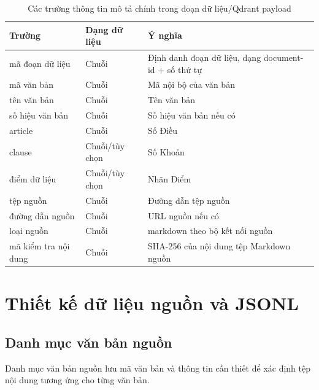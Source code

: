 \documentclass[12pt,a4paper,oneside]{report}
\begin{document}
\begin{longtable}{|L{3.4cm}|L{3.3cm}|L{7.8cm}|}
  \caption{Các trường thông tin mô tả chính trong đoạn dữ liệu/Qdrant payload}\label{tab:qdrant-payload} \\
  \hline
  \textbf{Trường}      & \textbf{Dạng dữ liệu} & \textbf{Ý nghĩa}                                        \\
  \hline
  mã đoạn dữ liệu      & Chuỗi                 & Định danh đoạn dữ liệu, dạng document-id + số thứ tự    \\
  \hline
  mã văn bản           & Chuỗi                 & Mã nội bộ của văn bản                                   \\
  \hline
  tên văn bản          & Chuỗi                 & Tên văn bản                                             \\
  \hline
  số hiệu văn bản      & Chuỗi                 & Số hiệu văn bản nếu có                                  \\
  \hline
  article              & Chuỗi                 & Số Điều                                                 \\
  \hline
  clause               & Chuỗi/tùy chọn        & Số Khoản                                                \\
  \hline
  điểm dữ liệu         & Chuỗi/tùy chọn        & Nhãn Điểm                                               \\
  \hline
  tệp nguồn            & Chuỗi                 & Đường dẫn tệp nguồn                                     \\
  \hline
  đường dẫn nguồn      & Chuỗi                 & URL nguồn nếu có                                        \\
  \hline
  loại nguồn           & Chuỗi                 & markdown theo bộ kết nối nguồn                          \\
  \hline
  mã kiểm tra nội dung & Chuỗi                 & SHA-256 của nội dung tệp Markdown nguồn                 \\
  \hline
\end{longtable}

\section{Thiết kế dữ liệu nguồn và JSONL}
\subsection{Danh mục văn bản nguồn}
Danh mục văn bản nguồn lưu mã văn bản và thông tin cần thiết để xác định tệp nội dung tương ứng cho từng văn bản.
\end{document}
